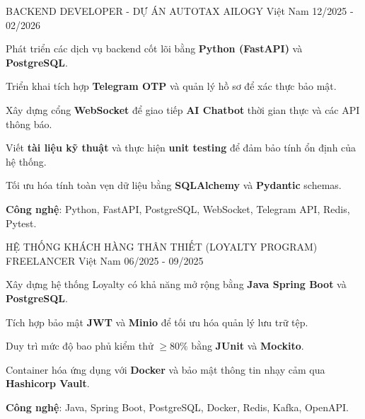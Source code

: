 \begin{cventries}
  \cventry
    {BACKEND DEVELOPER - DỰ ÁN AUTOTAX}
    {AILOGY}
    {Việt Nam}
    {12/2025 - 02/2026}
    {
      \begin{cvitems}
        \item {Phát triển các dịch vụ backend cốt lõi bằng \textbf{Python (FastAPI)} và \textbf{PostgreSQL}.}
        \item {Triển khai tích hợp \textbf{Telegram OTP} và quản lý hồ sơ để xác thực bảo mật.}
        \item {Xây dựng cổng \textbf{WebSocket} để giao tiếp \textbf{AI Chatbot} thời gian thực và các API thông báo.}
        \item {Viết \textbf{tài liệu kỹ thuật} và thực hiện \textbf{unit testing} để đảm bảo tính ổn định của hệ thống.}
        \item {Tối ưu hóa tính toàn vẹn dữ liệu bằng \textbf{SQLAlchemy} và \textbf{Pydantic} schemas.}
        \item {\textbf{Công nghệ}: Python, FastAPI, PostgreSQL, WebSocket, Telegram API, Redis, Pytest.}
      \end{cvitems}
    }

  \cventry
    {HỆ THỐNG KHÁCH HÀNG THÂN THIẾT (LOYALTY PROGRAM)}
    {FREELANCER}
    {Việt Nam}
    {06/2025 - 09/2025}
    {
      \begin{cvitems}
        \item {Xây dựng hệ thống Loyalty có khả năng mở rộng bằng \textbf{Java Spring Boot} và \textbf{PostgreSQL}.}
        \item {Tích hợp bảo mật \textbf{JWT} và \textbf{Minio} để tối ưu hóa quản lý lưu trữ tệp.}
        \item {Duy trì mức độ bao phủ kiểm thử \textbf{$\ge 80\%$} bằng \textbf{JUnit} và \textbf{Mockito}.}
        \item {Container hóa ứng dụng với \textbf{Docker} và bảo mật thông tin nhạy cảm qua \textbf{Hashicorp Vault}.}
        \item {\textbf{Công nghệ}: Java, Spring Boot, PostgreSQL, Docker, Redis, Kafka, OpenAPI.}
      \end{cvitems}
    }
\end{cventries}
